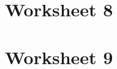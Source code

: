 \documentclass[12pt]{amsart}
\theoremstyle{definition}
\theoremstyle{remark}
\begin{document}
\newpage
\section{Worksheet 8}

\newpage
\section{Worksheet 9}
\end{document}
